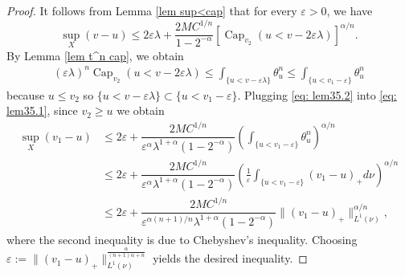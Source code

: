 \documentclass[a4paper,11pt]{amsart}
\numberwithin{equation}{section}
\theoremstyle{definition}
\newcommand{\capacity}{\mathop{\mathrm{Cap}}\nolimits}
\begin{document}
\begin{proof}
	It follows from Lemma \ref{lem sup<cap} that for every $\varepsilon>0$, we have
	\begin{equation}\label{eq: lem35.1}
	\sup_X(v-u)\leq 2\varepsilon\lambda+\dfrac{2 M C^{1/n}}{1-2^{-\alpha}}[\capacity_{v_2}(u<v-2\varepsilon\lambda)]^{\alpha/n}.
    \end{equation}
	By Lemma \ref{lem t^n cap}, we obtain
		\begin{equation}\label{eq: lem35.2}
		    \begin{split}
		        (\varepsilon\lambda)^n\capacity_{v_2}(u<v-2\varepsilon\lambda)\leq \int_{\{u<v-\varepsilon\lambda\}}\theta_u^n\leq \int_{\{u<v_1-\varepsilon\}}\theta_u^n
		    \end{split}
		\end{equation} because $u\leq v_2$ so $\{u<v-\varepsilon\lambda\}\subset\{u<v_1-\varepsilon\}$. 
   Plugging \eqref{eq: lem35.2} into \eqref{eq: lem35.1}, since $v_2\geq u$ we obtain     
        \begin{align*}
		    \sup_X(v_1-u)&\leq 
2\varepsilon+\dfrac{2 M C^{1/n}}{\varepsilon^{\alpha}\lambda^{1+\alpha} (1-2^{-\alpha})}\left(\int_{\{u<v_1-\varepsilon\}}\theta_u^n\right)^{\alpha/n}
\\
&\leq 2\varepsilon+\dfrac{2 M C^{1/n}}{\varepsilon^{\alpha}\lambda^{1+\alpha} (1-2^{-\alpha}) }\left(\frac{1}{\varepsilon}\int_{\{u<v_1-\varepsilon\}}(v_1-u)_+d\nu\right)^{\alpha/n} \\
&\leq  2\varepsilon+\dfrac{2 M C^{1/n}}{\varepsilon^{\alpha(n+1)/n}\lambda^{1+\alpha}(1-2^{-\alpha}) }\|(v_1-u)_+\|_{L^1(\nu)}^{\alpha/n},
		\end{align*} 
        where the second inequality is due to Chebyshev’s inequality.
Choosing $\varepsilon:=\|(v_1-u)_+\|_{L^1(\nu)}^{\frac{\alpha}{(n+1)\alpha+n}}$ yields the desired inequality.
\end{proof}
\end{document}
